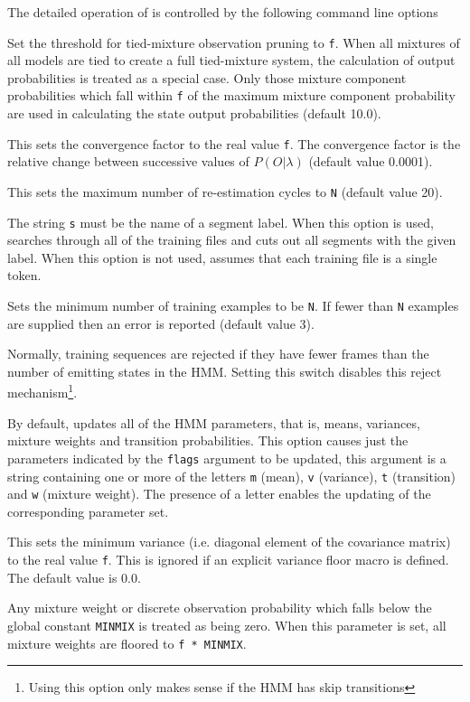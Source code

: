 The detailed operation of  is controlled by the following
command line options
\begin{optlist}
   Set the threshold for tied-mixture observation
      pruning to {\tt f}.
      When all mixtures of all models are tied to create a full
      tied-mixture system, the calculation of output probabilities
      is treated as a special case.  Only those 
      mixture component probabilities which fall within {\tt f} of
      the maximum mixture component probability are used in calculating
      the state output probabilities (default 10.0).

   This sets the convergence factor to the real value {\tt f}.
      The convergence factor is the relative change between successive
      values of $P({O}|\lambda)$ (default value 0.0001).

   This sets the maximum number of re-estimation cycles
      to {\tt N} (default value 20).

   The string {\tt s} must be the name of a
      segment label.  When this option is used,  searches
      through all of the training files and cuts out all segments with
      the given label.  When this option is not used,  assumes that
      each training file is a single token.

    Sets the minimum number of training examples to be {\tt N}.
      If fewer than {\tt N} examples are supplied then an error is
      reported (default value 3).

    Normally, training sequences are rejected if they
      have fewer frames
      than the number of emitting states in the HMM.  Setting this
      switch disables this reject mechanism\footnote{Using this option
      only makes sense if the HMM has skip transitions}.
      
    By default,  updates all 
      of the HMM parameters,
      that is, means, variances, mixture weights
      and transition probabilities. This 
      option causes just the parameters indicated by the {\tt flags}
      argument to be updated, this argument is a string containing one
      or more of the letters {\tt m} (mean), {\tt v} (variance), 
      {\tt t} (transition) and {\tt w} (mixture weight).  The presence of a
      letter enables the updating of the corresponding parameter set.

    This sets the minimum variance (i.e. diagonal element of
      the covariance matrix) to the real value {\tt f}.  This is ignored
      if an explicit variance floor macro is defined. The default value
      is 0.0.
      
    Any mixture weight or discrete observation probability
      which falls below the global
            constant {\tt MINMIX} is treated as being zero.
      When this parameter is  set,  all mixture weights  are floored
      to {\tt f * MINMIX}.

\stdoptB
\stdoptF
\stdoptG
\stdoptH
\stdoptI
\stdoptL
\stdoptM
\stdoptX

\end{optlist}

